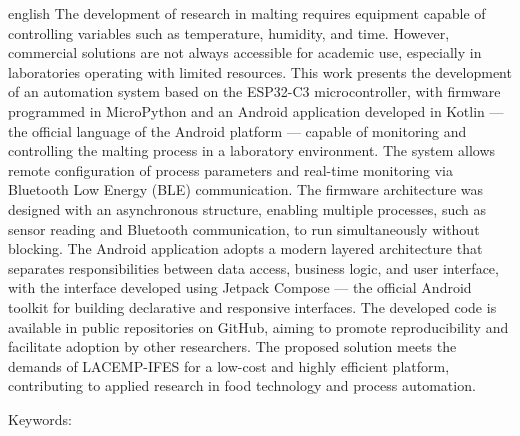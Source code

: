 \begin{resumo}[Abstract]
  \vspace{-15pt}
  
  \begin{otherlanguage*}{english}
    The development of research in malting requires equipment capable of controlling variables such as temperature, humidity, and time. However, commercial solutions are not always accessible for academic use, especially in laboratories operating with limited resources. This work presents the development of an automation system based on the ESP32-C3 microcontroller, with firmware programmed in MicroPython and an Android application developed in Kotlin — the official language of the Android platform — capable of monitoring and controlling the malting process in a laboratory environment. The system allows remote configuration of process parameters and real-time monitoring via Bluetooth Low Energy (BLE) communication. The firmware architecture was designed with an asynchronous structure, enabling multiple processes, such as sensor reading and Bluetooth communication, to run simultaneously without blocking. The Android application adopts a modern layered architecture that separates responsibilities between data access, business logic, and user interface, with the interface developed using Jetpack Compose — the official Android toolkit for building declarative and responsive interfaces. The developed code is available in public repositories on GitHub, aiming to promote reproducibility and facilitate adoption by other researchers. The proposed solution meets the demands of LACEMP-IFES for a low-cost and highly efficient platform, contributing to applied research in food technology and process automation.

  
  Keywords: \inlinekeywords
\end{otherlanguage*}
\end{resumo}